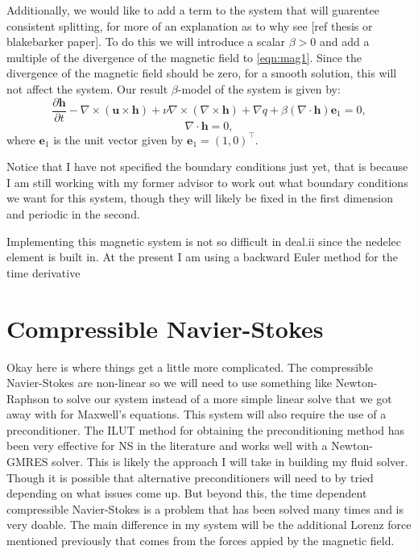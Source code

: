 \documentclass{article}
\begin{document}
Additionally, we would like to add a term to the system that will guarentee consistent splitting, for more of an explanation as to why see [ref thesis or blakebarker paper]. To do this we will introduce a scalar $\beta > 0$ and add a multiple of the divergence of the magnetic field to \eqref{eqn:mag1}. Since the divergence of the magnetic field should be zero, for a smooth solution, this will not affect the system. Our result $\beta$-model of the system is given by:
\begin{equation}\label{eqn:mag1}
    \frac{\partial \boldsymbol{h} }{\partial t} - \nabla \times (\boldsymbol{u}\times \boldsymbol{h}) + \nu \nabla \times (\nabla \times \boldsymbol{h}) + \nabla q + \beta (\nabla \cdot \boldsymbol{h})\boldsymbol{e}_1= 0,
\end{equation}
\begin{equation}\label{eqn:mag2}
    \nabla \cdot \boldsymbol{h} = 0,
\end{equation}
where $\boldsymbol{e}_1$ is the unit vector given by $\boldsymbol{e}_1 = (1, 0)^\top$. 

Notice that I have not specified the boundary conditions just yet, that is because I am still working with my former advisor to work out what boundary conditions we want for this system, though they will likely be fixed in the first dimension and periodic in the second. 

Implementing this magnetic system is not so difficult in deal.ii since the nedelec element is built in. At the present I am using a backward Euler method for the time derivative

\section*{Compressible Navier-Stokes}
Okay here is where things get a little more complicated. The compressible Navier-Stokes are non-linear so we will need to use something like Newton-Raphson to solve our system instead of a more simple linear solve that we got away with for Maxwell's equations. This system will also require the use of a preconditioner. The ILUT method for obtaining the preconditioning method has been very effective for NS in the literature and works well with a Newton-GMRES solver. This is likely the approach I will take in building my fluid solver. Though it is possible that alternative preconditioners will need to by tried depending on what issues come up. But beyond this, the time dependent compressible Navier-Stokes is a problem that has been solved many times and is very doable. The main difference in my system will be the additional Lorenz force mentioned previously that comes from the forces appied by the magnetic field. 
\end{document}
